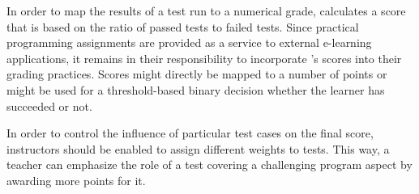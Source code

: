 In order to map the results of a test run to a numerical grade, \tool calculates a score that is based on the ratio of passed tests to failed tests. Since practical programming assignments are provided as a service to external e-learning applications, it remains in their responsibility to incorporate \tool's scores into their grading practices. Scores might directly be mapped to a number of points or might be used for a threshold-based binary decision whether the learner has succeeded or not.

In order to control the influence of particular test cases on the final score, instructors should be enabled to assign different weights to tests. This way, a teacher can emphasize the role of a test covering a challenging program aspect by awarding more points for it.
